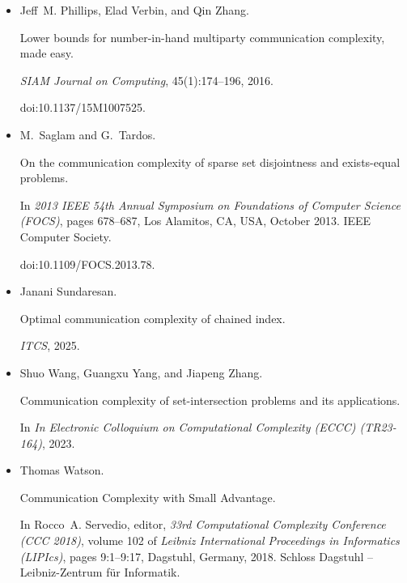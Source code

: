 \begin{itemize}
\item[] 
[41]

Jeff M. Phillips, Elad Verbin, and Qin Zhang.


Lower bounds for number-in-hand multiparty communication complexity,
made easy.


\emph{SIAM Journal on Computing}, 45(1):174–196, 2016.


doi:10.1137/15M1007525.





\item[] 
[42]

M. Saglam and G. Tardos.


On the communication complexity of sparse set disjointness and
exists-equal problems.


In \emph{2013 IEEE 54th Annual Symposium on Foundations of Computer
Science (FOCS)}, pages 678–687, Los Alamitos, CA, USA, October 2013. IEEE
Computer Society.


doi:10.1109/FOCS.2013.78.





\item[] 
[43]

Janani Sundaresan.


Optimal communication complexity of chained index.


\emph{ITCS}, 2025.





\item[] 
[44]

Shuo Wang, Guangxu Yang, and Jiapeng Zhang.


Communication complexity of set-intersection problems and its
applications.


In \emph{In Electronic Colloquium on Computational Complexity (ECCC)
(TR23-164)}, 2023.





\item[] 
[45]

Thomas Watson.


Communication Complexity with Small Advantage.


In Rocco A. Servedio, editor, \emph{33rd Computational Complexity
Conference (CCC 2018)}, volume 102 of \emph{Leibniz International Proceedings
in Informatics (LIPIcs)}, pages 9:1–9:17, Dagstuhl, Germany, 2018. Schloss
Dagstuhl – Leibniz-Zentrum für Informatik.



\end{itemize}
